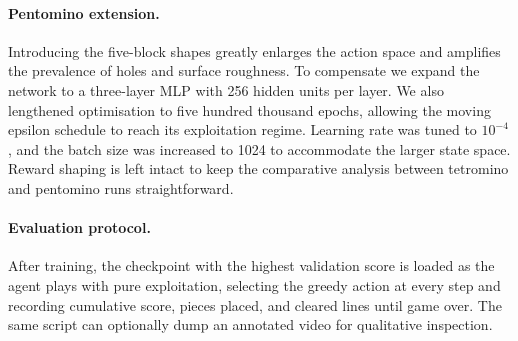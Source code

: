 \paragraph{Pentomino extension.}
Introducing the five-block shapes greatly enlarges the action space and amplifies the prevalence of holes and surface roughness.  To compensate we expand the network to a three-layer MLP with 256 hidden units per layer. We also lengthened optimisation to five hundred thousand epochs, allowing the moving epsilon schedule to reach its exploitation regime. Learning rate was tuned to $10^{-4}$, and the batch size was increased to 1024 to accommodate the larger state space. Reward shaping is left intact to keep the comparative analysis between tetromino and pentomino runs straightforward.

\paragraph{Evaluation protocol.}
After training, the checkpoint with the highest validation score is loaded as the agent plays with pure exploitation, selecting the greedy action at every step and recording cumulative score, pieces placed, and cleared lines until game over. The same script can optionally dump an annotated video for qualitative inspection.